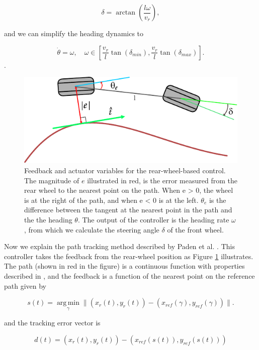 \documentclass[symmetry,article,submit,moreauthors,pdftex]{Definitions/mdpi}
\begin{document}
\begin{equation}
       \delta = \arctan \left(\frac{l\omega}{v_r}\right),
\end{equation}

and we can simplify the heading dynamics to 

\begin{equation}
    \dot{\theta} = \omega,\quad \omega \in \left[\frac{v_r}{l} \tan(\delta_{min}),\frac{v_r}{l} \tan(\delta_{max} ) \right].
\end{equation}.

\begin{figure}[H] \includegraphics[width=10.5 cm]{img/path} \caption{ Feedback
        and actuator variables for the rear-wheel-based control. The magnitude
        of $e$ illustrated in red, is the error measured from the rear wheel to
        the nearest point on the path. When e > 0, the wheel is at the right of
        the path, and when e < 0 is at the left. $\theta_e$ is the
        difference between the tangent at the nearest point in the path and the
        the heading $\theta$. The output of the controller is the heading rate
        $\omega$, from which we calculate the steering angle $\delta$ of the front wheel.
}\label{fig:kinematics}    \end{figure} 

Now we explain the path tracking method described by Paden et al.
\cite{paden_survey_2016}.  This controller takes the feedback from the
rear-wheel position as Figure \ref{fig:kinematics} illustrates.  The path
(shown in red in the figure) is a continuous function with properties
described in \cite{samson1992path}, and the feedback is a function of the
nearest point on the reference path given by 

\begin{equation}
s(t) = \operatorname*{arg\,min}_{\gamma} \|(x_r(t),y_r(t)) - (x_{ref}(\gamma),y_{ref}(\gamma)) \|.
\end{equation}

and the tracking error vector is 

\begin{equation}
d(t) = (x_r(t),y_r(t))-(x_{ref}(s(t)),y_{ref}(s(t)))
\end{equation}
\end{document}
